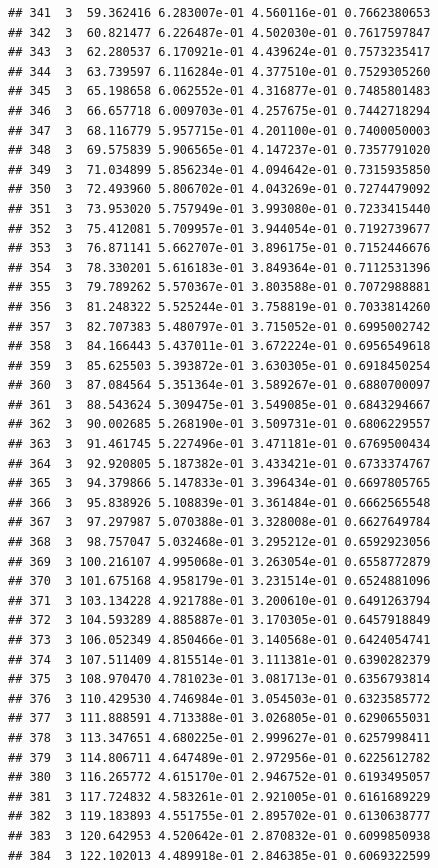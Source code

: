 \documentclass[article]{jss}\usepackage[]{graphicx}\usepackage[]{xcolor}
\makeatletter
\newenvironment{kframe}{%
 \def\at@end@of@kframe{}%
 \ifinner\ifhmode%
  \def\at@end@of@kframe{\end{minipage}}%
  \begin{minipage}{\columnwidth}%
 \fi\fi%
 \def\FrameCommand##1{\hskip\@totalleftmargin \hskip-\fboxsep
 \colorbox{shadecolor}{##1}\hskip-\fboxsep
     \hskip-\linewidth \hskip-\@totalleftmargin \hskip\columnwidth}%
 \MakeFramed {\advance\hsize-\width
   \@totalleftmargin\z@ \linewidth\hsize
   \@setminipage}}%
 {\par\unskip\endMakeFramed%
 \at@end@of@kframe}
\newenvironment{knitrout}{}{} %
\makeatother
\begin{document}
\begin{knitrout}
\begin{kframe}
\begin{verbatim}
## 341  3  59.362416 6.283007e-01 4.560116e-01 0.7662380653
## 342  3  60.821477 6.226487e-01 4.502030e-01 0.7617597847
## 343  3  62.280537 6.170921e-01 4.439624e-01 0.7573235417
## 344  3  63.739597 6.116284e-01 4.377510e-01 0.7529305260
## 345  3  65.198658 6.062552e-01 4.316877e-01 0.7485801483
## 346  3  66.657718 6.009703e-01 4.257675e-01 0.7442718294
## 347  3  68.116779 5.957715e-01 4.201100e-01 0.7400050003
## 348  3  69.575839 5.906565e-01 4.147237e-01 0.7357791020
## 349  3  71.034899 5.856234e-01 4.094642e-01 0.7315935850
## 350  3  72.493960 5.806702e-01 4.043269e-01 0.7274479092
## 351  3  73.953020 5.757949e-01 3.993080e-01 0.7233415440
## 352  3  75.412081 5.709957e-01 3.944054e-01 0.7192739677
## 353  3  76.871141 5.662707e-01 3.896175e-01 0.7152446676
## 354  3  78.330201 5.616183e-01 3.849364e-01 0.7112531396
## 355  3  79.789262 5.570367e-01 3.803588e-01 0.7072988881
## 356  3  81.248322 5.525244e-01 3.758819e-01 0.7033814260
## 357  3  82.707383 5.480797e-01 3.715052e-01 0.6995002742
## 358  3  84.166443 5.437011e-01 3.672224e-01 0.6956549618
## 359  3  85.625503 5.393872e-01 3.630305e-01 0.6918450254
## 360  3  87.084564 5.351364e-01 3.589267e-01 0.6880700097
## 361  3  88.543624 5.309475e-01 3.549085e-01 0.6843294667
## 362  3  90.002685 5.268190e-01 3.509731e-01 0.6806229557
## 363  3  91.461745 5.227496e-01 3.471181e-01 0.6769500434
## 364  3  92.920805 5.187382e-01 3.433421e-01 0.6733374767
## 365  3  94.379866 5.147833e-01 3.396434e-01 0.6697805765
## 366  3  95.838926 5.108839e-01 3.361484e-01 0.6662565548
## 367  3  97.297987 5.070388e-01 3.328008e-01 0.6627649784
## 368  3  98.757047 5.032468e-01 3.295212e-01 0.6592923056
## 369  3 100.216107 4.995068e-01 3.263054e-01 0.6558772879
## 370  3 101.675168 4.958179e-01 3.231514e-01 0.6524881096
## 371  3 103.134228 4.921788e-01 3.200610e-01 0.6491263794
## 372  3 104.593289 4.885887e-01 3.170305e-01 0.6457918849
## 373  3 106.052349 4.850466e-01 3.140568e-01 0.6424054741
## 374  3 107.511409 4.815514e-01 3.111381e-01 0.6390282379
## 375  3 108.970470 4.781023e-01 3.081713e-01 0.6356793814
## 376  3 110.429530 4.746984e-01 3.054503e-01 0.6323585772
## 377  3 111.888591 4.713388e-01 3.026805e-01 0.6290655031
## 378  3 113.347651 4.680225e-01 2.999627e-01 0.6257998411
## 379  3 114.806711 4.647489e-01 2.972956e-01 0.6225612782
## 380  3 116.265772 4.615170e-01 2.946752e-01 0.6193495057
## 381  3 117.724832 4.583261e-01 2.921005e-01 0.6161689229
## 382  3 119.183893 4.551755e-01 2.895702e-01 0.6130638777
## 383  3 120.642953 4.520642e-01 2.870832e-01 0.6099850938
## 384  3 122.102013 4.489918e-01 2.846385e-01 0.6069322599

\end{verbatim}
\end{kframe}
\end{knitrout}
\end{document}
